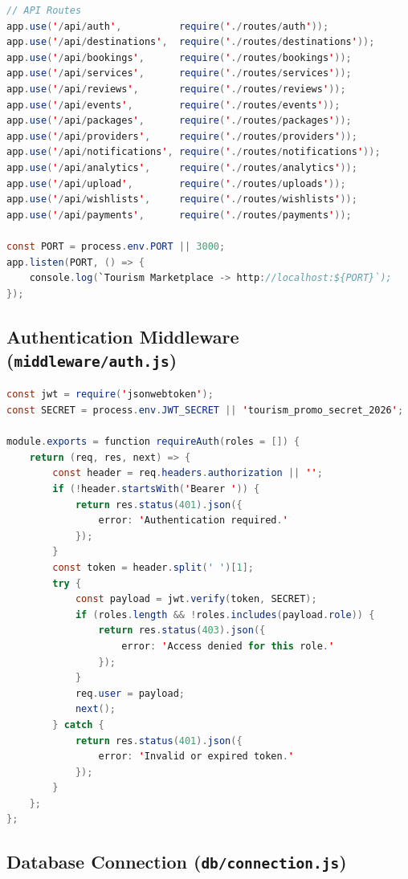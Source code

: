 \begin{lstlisting}[language=Java, caption={server.js -- Express.js Application Entry Point}]
// API Routes
app.use('/api/auth',          require('./routes/auth'));
app.use('/api/destinations',  require('./routes/destinations'));
app.use('/api/bookings',      require('./routes/bookings'));
app.use('/api/services',      require('./routes/services'));
app.use('/api/reviews',       require('./routes/reviews'));
app.use('/api/events',        require('./routes/events'));
app.use('/api/packages',      require('./routes/packages'));
app.use('/api/providers',     require('./routes/providers'));
app.use('/api/notifications', require('./routes/notifications'));
app.use('/api/analytics',     require('./routes/analytics'));
app.use('/api/upload',        require('./routes/uploads'));
app.use('/api/wishlists',     require('./routes/wishlists'));
app.use('/api/payments',      require('./routes/payments'));

const PORT = process.env.PORT || 3000;
app.listen(PORT, () => {
    console.log(`Tourism Marketplace -> http://localhost:${PORT}`);
});
\end{lstlisting}

\subsection*{Authentication Middleware (\texttt{middleware/auth.js})}

\begin{lstlisting}[language=Java, caption={auth.js -- JWT Authentication Middleware}]
const jwt = require('jsonwebtoken');
const SECRET = process.env.JWT_SECRET || 'tourism_promo_secret_2026';

module.exports = function requireAuth(roles = []) {
    return (req, res, next) => {
        const header = req.headers.authorization || '';
        if (!header.startsWith('Bearer ')) {
            return res.status(401).json({
                error: 'Authentication required.'
            });
        }
        const token = header.split(' ')[1];
        try {
            const payload = jwt.verify(token, SECRET);
            if (roles.length && !roles.includes(payload.role)) {
                return res.status(403).json({
                    error: 'Access denied for this role.'
                });
            }
            req.user = payload;
            next();
        } catch {
            return res.status(401).json({
                error: 'Invalid or expired token.'
            });
        }
    };
};
\end{lstlisting}

\subsection*{Database Connection (\texttt{db/connection.js})}

